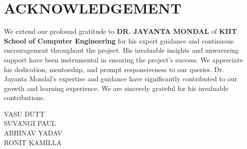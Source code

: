 \chapter*{\centering ACKNOWLEDGEMENT}

We extend our profound gratitude to \textbf{DR. JAYANTA MONDAL} of \textbf{KIIT School of Computer Engineering} for his expert guidance and continuous encouragement throughout the project. His invaluable insights and unwavering support have been instrumental in ensuring the project's success. We appreciate his dedication, mentorship, and prompt responsiveness to our queries. Dr. Jayanta Mondal's expertise and guidance have significantly contributed to our growth and learning experience. We are sincerely grateful for his invaluable contributions.

\begin{flushright}
	VASU DUTT\\SUVANGI PAUL\\ABHINAV YADAV\\RONIT KAMILLA
\end{flushright}
